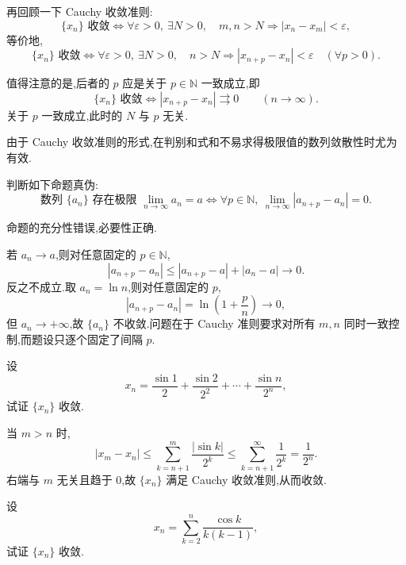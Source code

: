再回顾一下 Cauchy 收敛准则:
\[
  \{x_n\}\text{ 收敛}
  \iff
  \forall\varepsilon>0,\ \exists N>0,
  \quad m,n>N\Longrightarrow |x_n-x_m|<\varepsilon,
\]
等价地,
\[
  \{x_n\}\text{ 收敛}
  \iff
  \forall\varepsilon>0,\ \exists N>0,
  \quad n>N\Longrightarrow |x_{n+p}-x_n|<\varepsilon\quad(\forall p>0).
\]

\begin{remark}
  值得注意的是,后者的 $p$ 应是关于 $p\in\mathbb{N}$ 一致成立,即
  \[
    \{x_n\}\text{ 收敛}
    \iff
    |x_{n+p}-x_n|\rightrightarrows0\qquad(n\to\infty).
  \]
  关于 $p$ 一致成立,此时的 $N$ 与 $p$ 无关.
\end{remark}

由于 Cauchy 收敛准则的形式,在判别和式和不易求得极限值的数列敛散性时尤为有效.

\begin{example}
  判断如下命题真伪:
  \[
    \text{数列 }\{a_n\}\text{ 存在极限 }\lim\limits_{n\to\infty}a_n=a
    \iff
    \forall p\in\mathbb{N},\ \lim\limits_{n\to\infty}|a_{n+p}-a_n|=0.
  \]
\end{example}
\exampleblank

\begin{solution}
  命题的充分性错误,必要性正确.

  若 $a_n\to a$,则对任意固定的 $p\in\mathbb{N}$,
  \[
    |a_{n+p}-a_n|
    \leq|a_{n+p}-a|+|a_n-a|\longrightarrow0.
  \]
  反之不成立.取 $a_n=\ln n$,则对任意固定的 $p$,
  \[
    |a_{n+p}-a_n|=\ln\left(1+\dfrac{p}{n}\right)\longrightarrow0,
  \]
  但 $a_n\to+\infty$,故 $\{a_n\}$ 不收敛.问题在于 Cauchy 准则要求对所有
  $m,n$ 同时一致控制,而题设只逐个固定了间隔 $p$.
\end{solution}

\begin{example}
  设
  \[
    x_n=\dfrac{\sin1}{2}+\dfrac{\sin2}{2^2}+\cdots+\dfrac{\sin n}{2^n},
  \]
  试证 $\{x_n\}$ 收敛.
\end{example}
\exampleblank

\begin{solution}
  当 $m>n$ 时,
  \[
    |x_m-x_n|
    \leq\sum\limits_{k=n+1}^m\dfrac{|\sin k|}{2^k}
    \leq\sum\limits_{k=n+1}^{\infty}\dfrac{1}{2^k}
    =\dfrac{1}{2^n}.
  \]
  右端与 $m$ 无关且趋于 $0$,故 $\{x_n\}$ 满足 Cauchy 收敛准则,从而收敛.
\end{solution}

\begin{example}
  设
  \[
    x_n=\sum\limits_{k=2}^n\dfrac{\cos k}{k(k-1)},
  \]
  试证 $\{x_n\}$ 收敛.
\end{example}
\exampleblank

